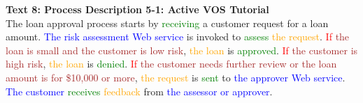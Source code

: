 \textbf{Text 8: Process Description 5-1: Active VOS Tutorial}\\
The loan approval process starts by \textcolor{green}{receiving} a customer request for a loan amount. \textcolor{blue}{The} \textcolor{blue}{risk} \textcolor{blue}{assessment} \textcolor{blue}{Web} \textcolor{blue}{service} is invoked to \textcolor{green}{assess} \textcolor{orange}{the} \textcolor{orange}{request}. \textcolor{red}{If} \textcolor{brown}{the} \textcolor{brown}{loan} \textcolor{brown}{is} \textcolor{brown}{small} \textcolor{brown}{and} \textcolor{brown}{the} \textcolor{brown}{customer} \textcolor{brown}{is} \textcolor{brown}{low} \textcolor{brown}{risk}, \textcolor{orange}{the} \textcolor{orange}{loan} is \textcolor{green}{approved}. \textcolor{red}{If} \textcolor{brown}{the} \textcolor{brown}{customer} \textcolor{brown}{is} \textcolor{brown}{high} \textcolor{brown}{risk}, \textcolor{orange}{the} \textcolor{orange}{loan} is \textcolor{green}{denied}. \textcolor{red}{If} \textcolor{brown}{the} \textcolor{brown}{customer} \textcolor{brown}{needs} \textcolor{brown}{further} \textcolor{brown}{review} \textcolor{brown}{or} \textcolor{brown}{the} \textcolor{brown}{loan} \textcolor{brown}{amount} \textcolor{brown}{is} \textcolor{brown}{for} \textcolor{brown}{\$10,000} \textcolor{brown}{or} \textcolor{brown}{more}, \textcolor{orange}{the} \textcolor{orange}{request} is \textcolor{green}{sent} to \textcolor{blue}{the} \textcolor{blue}{approver} \textcolor{blue}{Web} \textcolor{blue}{service}. \textcolor{blue}{The} \textcolor{blue}{customer} \textcolor{green}{receives} \textcolor{orange}{feedback} from \textcolor{blue}{the} \textcolor{blue}{assessor} \textcolor{blue}{or} \textcolor{blue}{approver}.

